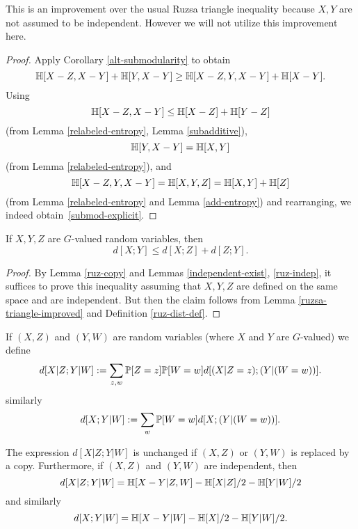 This is an improvement over the usual Ruzsa triangle inequality because $X,Y$ are not assumed to be independent.  However we will not utilize this improvement here.

\begin{proof}
  \leanok
  Apply Corollary \ref{alt-submodularity} to obtain
  \[\mathbb{H}[X - Z, X - Y] + \mathbb{H}[Y, X - Y] \geq \mathbb{H}[X - Z, Y, X - Y] + \mathbb{H}[X - Y].\]
  Using
  \[\mathbb{H}[X - Z, X - Y] \leq \mathbb{H}[X - Z] + \mathbb{H}[Y - Z]\]
  (from Lemma \ref{relabeled-entropy}, Lemma \ref{subadditive}),
  \[\mathbb{H}[Y, X - Y] = \mathbb{H}[X, Y] \]
  (from Lemma \ref{relabeled-entropy}), and
  \[\mathbb{H}[X - Z, Y, X - Y] = \mathbb{H}[X, Y, Z] = \mathbb{H}[X, Y] + \mathbb{H}[Z]\]
  (from Lemma \ref{relabeled-entropy} and Lemma \ref{add-entropy}) and rearranging, we indeed obtain~\eqref{submod-explicit}.
\end{proof}

\begin{lemma}
  \label{ruzsa-triangle}
  \leanok
  If $X,Y,Z$ are $G$-valued random variables, then
$$ d[X ;Y] \leq d[X ;Z] + d[Z;Y].$$
\end{lemma}

\begin{proof}\leanok By Lemma \ref{ruz-copy} and Lemmas \ref{independent-exist}, \ref{ruz-indep}, it suffices to prove this inequality assuming that $X,Y,Z$ are defined on the same space and are independent.  But then the claim follows from Lemma \ref{ruzsa-triangle-improved} and Definition \ref{ruz-dist-def}.
\end{proof}

\begin{definition}\label{cond-dist-def}
  \leanok
If $(X, Z)$ and $(Y, W)$ are random variables (where $X$ and $Y$ are $G$-valued) we define
$$ d[X  | Z; Y | W] := \sum_{z,w}  \mathbb{P}[Z=z]  \mathbb{P}[W=w] d[(X|Z=z); (Y|(W=w))].$$
similarly
$$ d[X ; Y | W] := \sum_{w}  \mathbb{P}[W=w] d[X ; (Y|(W=w))].$$
\end{definition}

\begin{lemma}\label{cond-dist-alt}
\leanok
  The expression $d[X  | Z;Y | W]$ is unchanged if $(X,Z)$ or $(Y,W)$ is replaced by a copy.  Furthermore, if $(X,Z)$ and $(Y,W)$ are independent, then
$$  d[X  | Z;Y | W] = \mathbb{H}[X-Y|Z,W] - \mathbb{H}[X|Z]/2 - \mathbb{H}[Y|W]/2$$
and similarly
$$  d[X ;Y | W] = \mathbb{H}[X-Y|W] - \mathbb{H}[X]/2 - \mathbb{H}[Y|W]/2.$$
\end{lemma}

